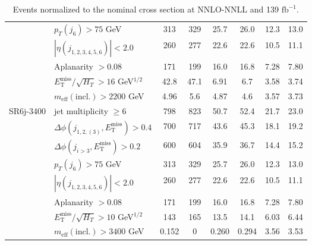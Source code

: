 \documentclass[10pt,fleqn]{article}
\newcommand{\ifb}{$\mathrm{fb}^{-1}$}
\newcommand{\met}{E^\mathrm{miss}_\mathrm{T}}
\newcommand{\meff}{m_\mathrm{eff}}
\begin{document}
\begin{table}[H]
\begin{tabular}{c|l|c|c|c|c|c|c}
             & $p_T(j_6) > 75$ GeV                             &     313    &   329     &  25.7      &   26.0    &      12.3    &   13.0        \\       
             & $|\eta(j_{1,2,3,4,5,6})|< 2.0$                  &     260    &   277     &  22.6      &   22.6    &      10.5    &   11.1         \\                        
             & Aplanarity $> 0.08$                             &     171    &   199     &  16.0      &   16.8    &      7.28    &   7.80        \\         
             & $\met/\sqrt{H_T} > 16$ GeV$^{1/2}$              &     42.8   &   47.1    &  6.91      &   6.7     &      3.58    &   3.74        \\    
             & $\meff(\mathrm{incl.}) > 2200$ GeV              &     4.96   &   5.6     &  4.87      &   4.6     &      3.57    &   3.73        \\ \midrule    
SR6j-3400    & jet multiplicity $\geq 6$                       &     798    &   823     &  50.7      &   52.4    &      21.7    &   23.0         \\
             & $\Delta\phi(j_{1,2,(3)},\met) > 0.4$            &     700    &   717     &  43.6      &   45.3    &      18.1    &   19.2         \\
             & $\Delta\phi(j_{i>3},\met) > 0.2$                &     600    &   604     &  35.9      &   36.7    &      14.4    &   15.2         \\      
             & $p_T(j_6) > 75$ GeV                             &     313    &   329     &  25.7      &   26.0    &      12.3    &   13.0        \\      
             & $|\eta(j_{1,2,3,4,5,6})|< 2.0$                  &     260    &   277     &  22.6      &   22.6    &      10.5    &   11.1         \\                      
             & Aplanarity $> 0.08$                             &     171    &   199     &  16.0      &   16.8    &      7.28    &   7.80        \\         
             & $\met/\sqrt{H_T} > 10$ GeV$^{1/2}$              &     143    &   165     &  13.5      &   14.1    &      6.03    &   6.44        \\    
             & $\meff(\mathrm{incl.}) > 3400$ GeV              &     0.152  &      0    &  0.260     &   0.294   &      3.56    &   3.53        \\ \bottomrule                 
\end{tabular}
\caption{Events normalized to the nominal cross section at NNLO-NNLL and 139 \ifb.}
\end{table}   
\end{document}
